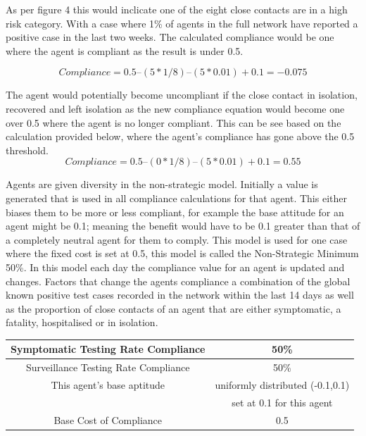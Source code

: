 \documentclass{article}
\begin{document}
As per figure 4 this would inclicate one of the eight close contacts are in a high risk category. With a case where 1\% of agents in the full network have reported a positive case in the last two weeks. The calculated compliance would be one where the agent is compliant as the result is under 0.5.

\[Compliance = 0.5 – (5 * 1/8) – (5*0.01) + 0.1 = -0.075\]


The agent would potentially become uncompliant if the close contact in isolation, recovered and left isolation as the new compliance equation would become one over 0.5 where the agent is no longer compliant. This can be see based on the calculation provided below, where the agent's compliance has gone above the 0.5 threshold.
\[Compliance = 0.5 – (0 * 1/8) – (5*0.01) + 0.1 = 0.55\]



Agents are given diversity in the non-strategic model. Initially a value is generated that is used in all compliance calculations for that agent. This either biases them to be more or less compliant, for example the base attitude for an agent might be 0.1; meaning the benefit would have to be 0.1 greater than that of a completely neutral agent for them to comply. This model is used for one case where the fixed cost is set at 0.5, this model is called the Non-Strategic Minimum 50\%.  In this model each day the compliance value for an agent is updated and changes. Factors that change the agents compliance a combination of the global known positive test cases recorded in the network within the last 14 days as well as the proportion of close contacts of an agent that are either symptomatic, a fatality, hospitalised or in isolation.\newline



\begin{tabular}{|c|c|}
\hline
Symptomatic Testing Rate Compliance & 50\% \\ \hline
Surveillance Testing Rate Compliance & 50\% \\ \hline
This agent’s base aptitude & uniformly distributed (-0.1,0.1) \\ 
&  set at 0.1 for this agent\\ \hline
Base Cost of Compliance & 0.5 \\ \hline
\end{tabular}
\newline


\newpage
\end{document}
